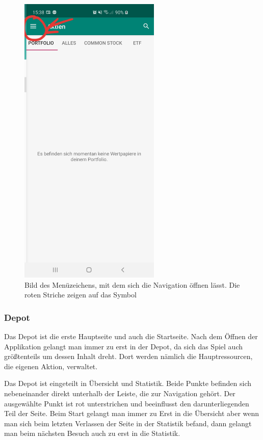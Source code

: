 \documentclass[10pt]{scrartcl}
\begin{document}
\begin{figure}[H]
	\centering
	\includegraphics[width=0.6\textwidth]{Bilder/Applikation/NavigationsSymbol.jpg}
	\caption{Bild des Menüzeichens, mit dem sich die Navigation öffnen lässt. Die roten Striche zeigen auf das Symbol}
\end{figure}



\subsubsection{Depot}
Das Depot ist die erste Hauptseite und auch die Startseite. Nach dem Öffnen der Applikation gelangt man immer zu erst in der Depot, da sich das Spiel auch größtenteils um dessen Inhalt dreht. Dort werden nämlich die Hauptressourcen, die eigenen Aktion, verwaltet.

Das Depot ist eingeteilt in Übersicht und Statistik. Beide Punkte befinden sich nebeneinander direkt unterhalb der Leiste, die zur Navigation gehört. Der ausgewählte Punkt ist rot unterstrichen und beeinflusst den darunterliegenden Teil der Seite. Beim Start gelangt man immer zu Erst in die Übersicht aber wenn man sich beim letzten Verlassen der Seite in der Statistik befand, dann gelangt man beim nächsten Besuch auch zu erst in die Statistik.
\end{document}
